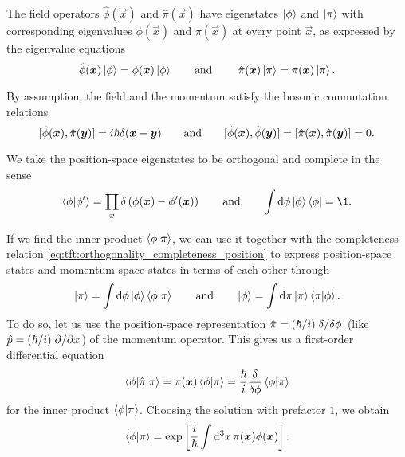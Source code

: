 The field operators $\hat{\phi}(\vec{x})$ and $\hat{\pi}(\vec{x})$ have eigenstates $\ket{\phi}$ and $\ket{\pi}$ with corresponding eigenvalues $\phi(\vec{x})$ and $\pi(\vec{x})$ at every point $\vec{x}$, as expressed by the eigenvalue equations
\begin{equation}
	\hat{\phi}(\vec{x}) \ket{\phi} = \phi(\vec{x}) \ket{\phi}
	\qquad \text{and} \qquad
	\hat{\pi}(\vec{x}) \ket{\pi} = \pi(\vec{x}) \ket{\pi} .
\label{eq:tft:field_eigenvalue_equations}
\end{equation}

By assumption, the field and the momentum satisfy the bosonic commutation relations
\begin{equation}
	[ \hat{\phi}({\bm{x}}) , \hat{\pi}({\bm{y}}) ] = i \hbar \delta({\bm{x}} - {\bm{y}})
	\qquad \text{and} \qquad
	[ \hat{\phi}({\bm{x}}) , \hat{\phi}({\bm{y}}) ] = 
	[ \hat{\pi}({\bm{x}}) , \hat{\pi}({\bm{y}}) ] = 
	0 .
\label{eq:tft:boson_field_commutators}
\end{equation}

We take the position-space eigenstates to be orthogonal and complete in the sense
\begin{equation}
	\braket{\phi | \phi'} = \prod_{\vec{x}} \delta \left( \phi(\vec{x}) - \phi'(\vec{x}) \right)
	\qquad \text{and} \qquad
	\int \dif \phi \ket{\phi} \bra{\phi} = \1 .
	\label{eq:tft:orthogonality_completeness_position}
\end{equation}

\newcommand{\posmom}[2]{\exp \left[  \frac{i}{\hbar} \int \dif^3 x \, #2(\vec{x}) #1(\vec{x}) \right]}
\newcommand{\mompos}[2]{\exp \left( -\frac{i}{\hbar} \int \dif^3 x \, #1(\vec{x}) #2(\vec{x}) \right)}
If we find the inner product $\braket{\phi | \pi}$, we can use it together with the completeness relation \eqref{eq:tft:orthogonality_completeness_position} to express position-space states and momentum-space states in terms of each other through
\begin{equation}
	\ket\pi = \int \dif \phi \ket\phi \braket{\phi | \pi} %
	\qquad \text{and} \qquad
	\ket\phi = \int \dif \pi \ket\pi \braket{\pi | \phi} . %
\end{equation}
To do so, let us use the position-space representation $\hat{\pi} = (\hbar / i) \fdv{}/{\phi}$ (like $\hat{p} = (\hbar/i) \pdv{}/{x}$) of the momentum operator.
This gives us a first-order differential equation
\begin{equation}
	\braket{\phi | \hat{\pi} | \pi} = \pi(\vec{x}) \braket{\phi | \pi} = \frac{\hbar}{i} \fdv*{\braket{\phi | \pi}}{\phi}
\end{equation}
for the inner product $\braket{\phi | \pi}$.
Choosing the solution with prefactor $1$, we obtain
\begin{equation}
	\braket{\phi | \pi} = \posmom{\phi}{\pi} .
	\label{eq:tft:inner_product_position_momentum}
\end{equation}

